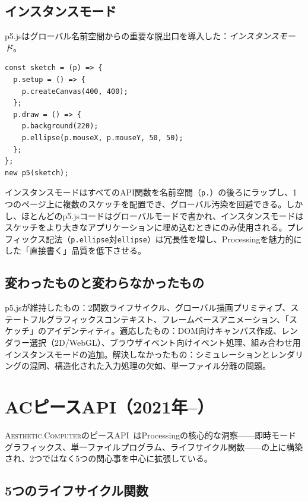 \documentclass[10pt,letterpaper,twocolumn]{article}
\newcommand{\ac}{\textsc{Aesthetic.Computer}}
\begin{document}
\subsection{インスタンスモード}

p5.jsはグローバル名前空間からの重要な脱出口を導入した：\emph{インスタンスモード}。

\begin{lstlisting}[style=p5style,caption={p5.jsインスタンスモード。}]
const sketch = (p) => {
  p.setup = () => {
    p.createCanvas(400, 400);
  };
  p.draw = () => {
    p.background(220);
    p.ellipse(p.mouseX, p.mouseY, 50, 50);
  };
};
new p5(sketch);
\end{lstlisting}

インスタンスモードはすべてのAPI関数を名前空間（\texttt{p.}）の後ろにラップし、1つのページ上に複数のスケッチを配置でき、グローバル汚染を回避できる。しかし、ほとんどのp5.jsコードはグローバルモードで書かれ、インスタンスモードはスケッチをより大きなアプリケーションに埋め込むときにのみ使用される。プレフィックス記法（\texttt{p.ellipse}対\texttt{ellipse}）は冗長性を増し、Processingを魅力的にした「直接書く」品質を低下させる。

\subsection{変わったものと変わらなかったもの}

p5.jsが維持したもの：2関数ライフサイクル、グローバル描画プリミティブ、ステートフルグラフィックスコンテキスト、フレームベースアニメーション、「スケッチ」のアイデンティティ。適応したもの：DOM向けキャンバス作成、レンダラー選択（2D/WebGL）、ブラウザイベント向けイベント処理、組み合わせ用インスタンスモードの追加。解決しなかったもの：シミュレーションとレンダリングの混同、構造化された入力処理の欠如、単一ファイル分離の問題。


\section{ACピースAPI（2021年--）}
\label{sec:ac}

\ac{}のピースAPI~\citep{scudder2026ac}はProcessingの核心的な洞察——即時モードグラフィックス、単一ファイルプログラム、ライフサイクル関数——の上に構築され、2つではなく5つの関心事を中心に拡張している。

\subsection{5つのライフサイクル関数}
\end{document}
